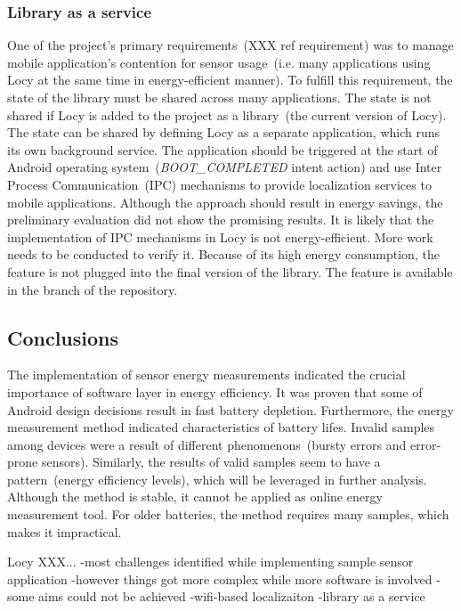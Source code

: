 \subsubsection{Library as a service}
One of the project's primary requirements\ (XXX ref requirement) was to manage mobile application's contention for sensor usage\ (i.e. many applications using Locy at the same time in energy-efficient manner). To fulfill this requirement, the state of the library must be shared across many applications. The state is not shared if Locy is added to the project as a library\ (the current version of Locy). The state can be shared by defining Locy as a separate application, which runs its own background service. The application should be triggered at the start of Android operating system\ (\textit{BOOT_COMPLETED} intent action) and use Inter Process Communication\ (IPC) mechanisms to provide localization services to mobile applications. Although the approach should result in energy savings, the preliminary evaluation did not show the promising results. It is likely that the implementation of IPC mechanisms in Locy is not energy-efficient. More work needs to be conducted to verify it. Because of its high energy consumption, the feature is not plugged into the final version of the library. The feature is available in the  branch of the repository.

\subsection{Conclusions}
The implementation of sensor energy measurements indicated the crucial importance of software layer in energy efficiency. It was proven that some of Android design decisions result in fast battery depletion. Furthermore, the energy measurement method indicated characteristics of battery lifes. Invalid samples among devices were a result of different phenomenons\ (bursty errors and error-prone sensors). Similarly, the results of valid samples seem to have a pattern\ (energy efficiency levels), which will be leveraged in further analysis. Although the method is stable, it cannot be applied as online energy measurement tool. For older batteries, the method requires many samples, which makes it impractical.

Locy XXX...
	-most challenges identified while implementing sample sensor application
	-however things got more complex while more software is involved
		-some aims could not be achieved
			-wifi-based localizaiton
			-library as a service